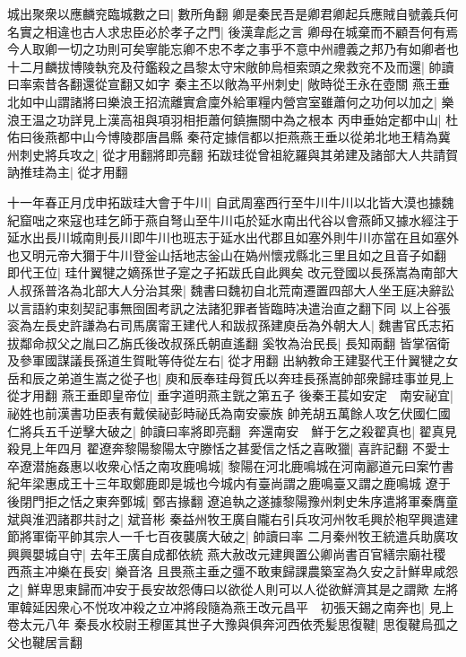 城出聚衆以應麟兖臨城數之曰|{
	數所角翻}
卿是秦民吾是卿君卿起兵應賊自號義兵何名實之相違也古人求忠臣必於孝子之門|{
	後漢韋彪之言}
卿母在城棄而不顧吾何有焉今人取卿一切之功則可矣寧能忘卿不忠不孝之事乎不意中州禮義之邦乃有如卿者也十二月麟拔博陵執兖及苻鑑殺之昌黎太守宋敞帥烏桓索頭之衆救兖不及而還|{
	帥讀曰率索昔各翻還從宣翻又如字}
秦主丕以敞為平州刺史|{
	敞時從王永在壺關}
燕王垂北如中山謂諸將曰樂浪王招流離實倉廩外給軍糧内營宫室雖蕭何之功何以加之|{
	樂浪王温之功詳見上漢高祖與項羽相拒蕭何鎮撫關中為之根本}
丙申垂始定都中山|{
	杜佑曰後燕都中山今博陵郡唐昌縣}
秦苻定據信都以拒燕燕王垂以從弟北地王精為冀州刺史將兵攻之|{
	從才用翻將即亮翻}
拓跋珪從曾祖紇羅與其弟建及諸部大人共請賀訥推珪為主|{
	從才用翻}


十一年春正月戊申拓跋珪大會于牛川|{
	自武周塞西行至牛川牛川以北皆大漠也據魏紀窟咄之來寇也珪乞師于燕自弩山至牛川屯於延水南出代谷以會燕師又據水經注于延水出長川城南則長川即牛川也班志于延水出代郡且如塞外則牛川亦當在且如塞外也又明元帝大獮于牛川登釡山括地志釡山在媯州懷戎縣北三里且如之且音子如翻}
即代王位|{
	珪什翼犍之嫡孫世子寔之子拓跋氏自此興矣}
改元登國以長孫嵩為南部大人叔孫普洛為北部大人分治其衆|{
	魏書曰魏初自北荒南遷置四部大人坐王庭决辭訟以言語約束刻契記事無囹圄考訊之法諸犯罪者皆臨時决遣治直之翻下同}
以上谷張衮為左長史許謙為右司馬廣甯王建代人和跋叔孫建庾岳為外朝大人|{
	魏書官氏志拓拔鄰命叔父之胤曰乙旃氏後改叔孫氏朝直遙翻}
奚牧為治民長|{
	長知兩翻}
皆掌宿衛及參軍國謀議長孫道生賀毗等侍從左右|{
	從才用翻}
出納教命王建娶代王什翼犍之女岳和辰之弟道生嵩之從子也|{
	庾和辰奉珪母賀氏以奔珪長孫嵩帥部衆歸珪事並見上從才用翻}
燕王垂即皇帝位|{
	垂字道明燕主皝之第五子}
後秦王萇如安定　南安祕宜|{
	祕姓也前漢書功臣表有戴侯祕彭時祕氏為南安豪族}
帥羌胡五萬餘人攻乞伏國仁國仁將兵五千逆擊大破之|{
	帥讀曰率將即亮翻}
奔還南安　鮮于乞之殺翟真也|{
	翟真見殺見上年四月}
翟遼奔黎陽黎陽太守滕恬之甚愛信之恬之喜畋獵|{
	喜許記翻}
不愛士卒遼潜施姦惠以收衆心恬之南攻鹿鳴城|{
	黎陽在河北鹿鳴城在河南酈道元曰案竹書紀年梁惠成王十三年取鄭鹿即是城也今城内有臺尚謂之鹿鳴臺又謂之鹿鳴城}
遼于後閉門拒之恬之東奔鄄城|{
	鄄吉掾翻}
遼追執之遂據黎陽豫州刺史朱序遣將軍秦膺童斌與淮泗諸郡共討之|{
	斌音彬}
秦益州牧王廣自隴右引兵攻河州牧毛興於枹罕興遣建節將軍衛平帥其宗人一千七百夜襲廣大破之|{
	帥讀曰率}
二月秦州牧王統遣兵助廣攻興興嬰城自守|{
	去年王廣自成都依統}
燕大赦改元建興置公卿尚書百官繕宗廟社稷　西燕主冲樂在長安|{
	樂音洛}
且畏燕主垂之彊不敢東歸課農築室為久安之計鮮卑咸怨之|{
	鮮卑思東歸而冲安于長安故怨傳曰以欲從人則可以人從欲鮮濟其是之謂歟}
左將軍韓延因衆心不悦攻冲殺之立冲將段隨為燕王改元昌平　初張天錫之南奔也|{
	見上卷太元八年}
秦長水校尉王穆匿其世子大豫與俱奔河西依秃髪思復鞬|{
	思復鞬烏孤之父也鞬居言翻}
